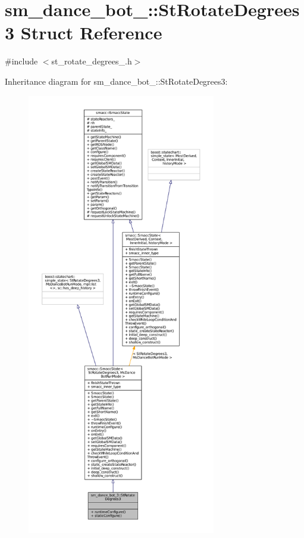 \hypertarget{structsm__dance__bot__3_1_1StRotateDegrees3}{}\section{sm\+\_\+dance\+\_\+bot\+\_\+:\+:St\+Rotate\+Degrees3 Struct Reference}
\label{structsm__dance__bot__3_1_1StRotateDegrees3}


{\ttfamily \#include $<$st\+\_\+rotate\+\_\+degrees\+\_.\+h$>$}



Inheritance diagram for sm\+\_\+dance\+\_\+bot\+\_\+:\+:St\+Rotate\+Degrees3\+:
\nopagebreak
\begin{figure}[H]
\begin{center}
\leavevmode
\includegraphics[height=550pt]{structsm__dance__bot__3_1_1StRotateDegrees3__inherit__graph}
\end{center}
\end{figure}


